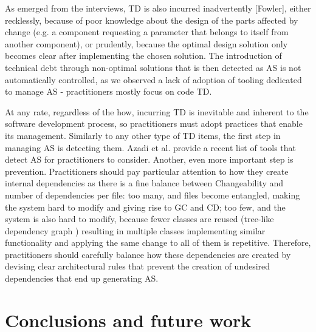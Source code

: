 As emerged from the interviews, TD is also incurred inadvertently [Fowler], either recklessly, because of poor knowledge about the design of the parts affected by change (e.g. a component requesting a parameter that belongs to itself from another component), or prudently, because the optimal design solution only becomes clear after implementing the chosen solution. The introduction of technical debt through non-optimal solutions that is then detected as AS is not automatically controlled, as we observed a lack of adoption of tooling dedicated to manage AS - practitioners mostly focus on code TD.

At any rate, regardless of the how, incurring TD is inevitable and inherent to the software development process, so practitioners must adopt practices that enable its management. Similarly to any other type of TD items, the first step in managing AS is detecting them. Azadi et al. provide a recent list of tools that detect AS \cite{Azadi2019} for practitioners to consider. Another, even more important step is prevention. Practitioners should pay particular attention to how they create internal dependencies as there is a fine balance between Changeability and number of dependencies per file: too many, and files become entangled, making the system hard to modify and giving rise to GC and CD; too few, and the system is also hard to modify, because fewer classes are reused (tree-like dependency graph  \cite{Lippert2006}) resulting in multiple classes implementing similar functionality and applying the same change to all of them is repetitive. Therefore, practitioners should carefully balance how these dependencies are created by devising clear architectural rules that prevent the creation of undesired dependencies that end up generating AS.

\section{Conclusions and future work}

